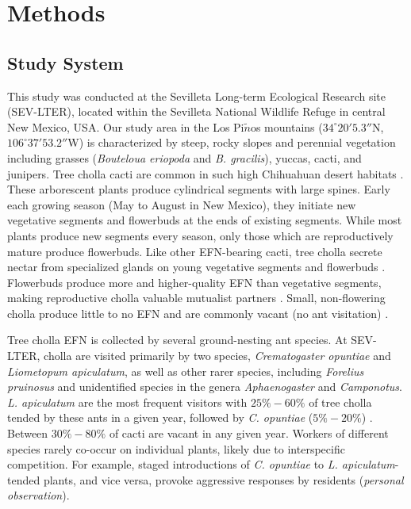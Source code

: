 \documentclass[11pt]{article}
\begin{document}
\section*{Methods}
\subsection*{Study System}
  
This study was conducted at the Sevilleta Long-term Ecological Research site (SEV-LTER), located within the Sevilleta National Wildlife Refuge in central New Mexico, USA.
Our study area in the Los Pi$\tilde{n}$os mountains ($34^\circ20'5.3''$N, $106^\circ37'53.2''$W) is characterized by steep, rocky slopes and perennial vegetation including grasses (\textit{Bouteloua eriopoda} and \textit{B. gracilis}), yuccas, cacti, and junipers. 
Tree cholla cacti are common in such high Chihuahuan desert habitats \citep{Benson1982}. 
These arborescent plants produce cylindrical segments with large spines. 
Early each growing season (May to August in New Mexico), they initiate new vegetative segments and flowerbuds at the ends of existing segments. 
While most plants produce new segments every season, only those which are reproductively mature produce flowerbuds. 
Like other EFN-bearing cacti, tree cholla secrete nectar from specialized glands on young vegetative segments and flowerbuds \citep{Ness2006,Oliveira1999}. 
Flowerbuds produce more and higher-quality EFN than vegetative segments, making reproductive cholla valuable mutualist partners \citep{Miller2014}. 
Small, non-flowering cholla produce little to no EFN and are commonly vacant (no ant visitation) \citep{Miller2014}. 

Tree cholla EFN is collected by several ground-nesting ant species. 
At SEV-LTER, cholla are visited primarily by two species, \textit{Crematogaster opuntiae} and \textit{Liometopum apiculatum}, as well as other rarer species, including \textit{Forelius pruinosus} and unidentified species in the genera \textit{Aphaenogaster} and \textit{Camponotus}.
\textit{L. apiculatum} are the most frequent visitors with $25\% - 60\%$ of tree cholla tended by these ants in a given year, followed by \textit{C. opuntiae} ($5\% - 20\%$) \citep{Donald2022}. 
Between $ 30\% - 80\%$ of cacti are vacant in any given year. 
Workers of different species rarely co-occur on individual plants, likely due to interspecific competition. 
For example, staged introductions of \textit{C. opuntiae} to \textit{L. apiculatum}-tended plants, and vice versa, provoke aggressive responses by residents (\textit{personal observation}).
\end{document}
